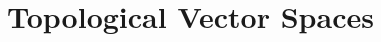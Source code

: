 \documentclass[a4paper]{book}
\begin{document}
\tableofcontents

\chapter{Topological Vector Spaces}




\chapter{}
\end{document}
